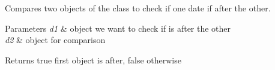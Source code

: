 Compares two objects of the class to check if one date if after the other. 


\begin{DoxyParams}{Parameters}
{\em d1} & object we want to check if is after the other \\
\hline
{\em d2} & object for comparison\\
\hline
\end{DoxyParams}
\begin{DoxyReturn}{Returns}
true first object is after, false otherwise 
\end{DoxyReturn}

